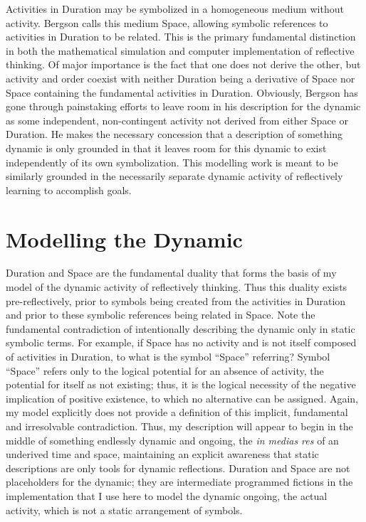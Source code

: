 Activities in Duration may be symbolized in a homogeneous medium
without activity.  Bergson calls this medium Space, allowing symbolic
references to activities in Duration to be related.  This is the
primary fundamental distinction in both the mathematical simulation
and computer implementation of reflective thinking.  Of major
importance is the fact that one does not derive the other, but
activity and order coexist with neither Duration being a derivative of
Space nor Space containing the fundamental activities in Duration.
Obviously, Bergson has gone through painstaking efforts to leave room
in his description for the dynamic as some independent, non-contingent
activity not derived from either Space or Duration.  He makes the
necessary concession that a description of something dynamic is only
grounded in that it leaves room for this dynamic to exist
independently of its own symbolization.  This modelling work is meant
to be similarly grounded in the necessarily separate dynamic activity
of reflectively learning to accomplish goals.

\section{Modelling the Dynamic}
\label{section:modelling_the_dynamic}

Duration and Space are the fundamental duality that forms the basis of
my model of the dynamic activity of reflectively thinking.  Thus this
duality exists pre-reflectively, prior to symbols being created from
the activities in Duration and prior to these symbolic references
being related in Space.  Note the fundamental contradiction of
intentionally describing the dynamic only in static symbolic terms.
For example, if Space has no activity and is not itself composed of
activities in Duration, to what is the symbol ``Space'' referring?
Symbol ``Space'' refers only to the logical potential for an absence
of activity, the potential for itself as not existing; thus, it is the
logical necessity of the negative implication of positive existence,
to which no alternative can be assigned.  Again, my model explicitly
does not provide a definition of this implicit, fundamental and
irresolvable contradiction.  Thus, my description will appear to begin
in the middle of something endlessly dynamic and ongoing, the \emph{in
  medias res} of an underived time and space, maintaining an explicit
awareness that static descriptions are only tools for dynamic
reflections.  Duration and Space are not placeholders for the dynamic;
they are intermediate programmed fictions in the implementation that I
use here to model the dynamic ongoing, the actual activity, which is
not a static arrangement of symbols.


